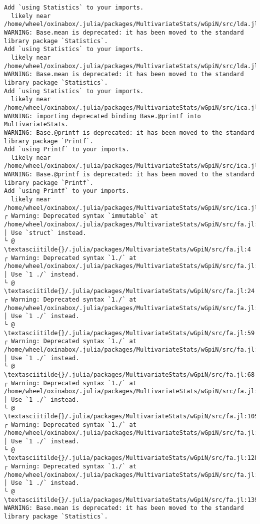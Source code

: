 \documentclass[11pt]{article}
\begin{document}
\begin{Verbatim}[commandchars=\\\{\}]
Add `using Statistics` to your imports.
  likely near /home/wheel/oxinabox/.julia/packages/MultivariateStats/wGpiN/src/lda.jl:128
WARNING: Base.mean is deprecated: it has been moved to the standard library package `Statistics`.
Add `using Statistics` to your imports.
  likely near /home/wheel/oxinabox/.julia/packages/MultivariateStats/wGpiN/src/lda.jl:215
WARNING: Base.mean is deprecated: it has been moved to the standard library package `Statistics`.
Add `using Statistics` to your imports.
  likely near /home/wheel/oxinabox/.julia/packages/MultivariateStats/wGpiN/src/ica.jl:12
WARNING: importing deprecated binding Base.@printf into MultivariateStats.
WARNING: Base.@printf is deprecated: it has been moved to the standard library package `Printf`.
Add `using Printf` to your imports.
  likely near /home/wheel/oxinabox/.julia/packages/MultivariateStats/wGpiN/src/ica.jl:58
WARNING: Base.@printf is deprecated: it has been moved to the standard library package `Printf`.
Add `using Printf` to your imports.
  likely near /home/wheel/oxinabox/.julia/packages/MultivariateStats/wGpiN/src/ica.jl:58
┌ Warning: Deprecated syntax `immutable` at /home/wheel/oxinabox/.julia/packages/MultivariateStats/wGpiN/src/fa.jl:4.
│ Use `struct` instead.
└ @ \textasciitilde{}/.julia/packages/MultivariateStats/wGpiN/src/fa.jl:4
┌ Warning: Deprecated syntax `1./` at /home/wheel/oxinabox/.julia/packages/MultivariateStats/wGpiN/src/fa.jl:24.
│ Use `1 ./` instead.
└ @ \textasciitilde{}/.julia/packages/MultivariateStats/wGpiN/src/fa.jl:24
┌ Warning: Deprecated syntax `1./` at /home/wheel/oxinabox/.julia/packages/MultivariateStats/wGpiN/src/fa.jl:59.
│ Use `1 ./` instead.
└ @ \textasciitilde{}/.julia/packages/MultivariateStats/wGpiN/src/fa.jl:59
┌ Warning: Deprecated syntax `1./` at /home/wheel/oxinabox/.julia/packages/MultivariateStats/wGpiN/src/fa.jl:68.
│ Use `1 ./` instead.
└ @ \textasciitilde{}/.julia/packages/MultivariateStats/wGpiN/src/fa.jl:68
┌ Warning: Deprecated syntax `1./` at /home/wheel/oxinabox/.julia/packages/MultivariateStats/wGpiN/src/fa.jl:105.
│ Use `1 ./` instead.
└ @ \textasciitilde{}/.julia/packages/MultivariateStats/wGpiN/src/fa.jl:105
┌ Warning: Deprecated syntax `1./` at /home/wheel/oxinabox/.julia/packages/MultivariateStats/wGpiN/src/fa.jl:128.
│ Use `1 ./` instead.
└ @ \textasciitilde{}/.julia/packages/MultivariateStats/wGpiN/src/fa.jl:128
┌ Warning: Deprecated syntax `1./` at /home/wheel/oxinabox/.julia/packages/MultivariateStats/wGpiN/src/fa.jl:139.
│ Use `1 ./` instead.
└ @ \textasciitilde{}/.julia/packages/MultivariateStats/wGpiN/src/fa.jl:139
WARNING: Base.mean is deprecated: it has been moved to the standard library package `Statistics`.

\end{Verbatim}
\end{document}
